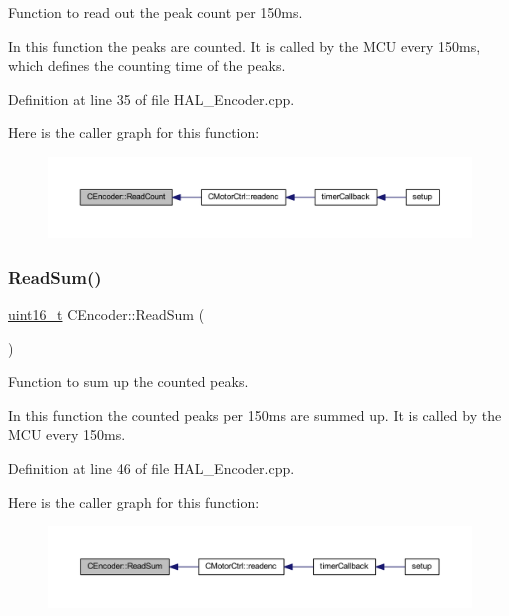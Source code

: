 Function to read out the peak count per 150ms. 

In this function the peaks are counted. It is called by the M\+CU every 150ms, which defines the counting time of the peaks. 

Definition at line 35 of file H\+A\+L\+\_\+\+Encoder.\+cpp.

Here is the caller graph for this function\+:
\nopagebreak
\begin{figure}[H]
\begin{center}
\leavevmode
\includegraphics[width=350pt]{class_c_encoder_a5911a289a7ed8a32e0a89e6191e1651c_icgraph}
\end{center}
\end{figure}
\mbox{\label{class_c_encoder_aa38f17afea1ce9b6efd9d95335a95d26}} 
\subsubsection{\texorpdfstring{Read\+Sum()}{ReadSum()}}
{\footnotesize\ttfamily \mbox{\hyperlink{_a_d_a_s___types_8h_a1f1825b69244eb3ad2c7165ddc99c956}{uint16\+\_\+t}} C\+Encoder\+::\+Read\+Sum (\begin{DoxyParamCaption}{ }\end{DoxyParamCaption})}



Function to sum up the counted peaks. 

In this function the counted peaks per 150ms are summed up. It is called by the M\+CU every 150ms. 

Definition at line 46 of file H\+A\+L\+\_\+\+Encoder.\+cpp.

Here is the caller graph for this function\+:
\nopagebreak
\begin{figure}[H]
\begin{center}
\leavevmode
\includegraphics[width=350pt]{class_c_encoder_aa38f17afea1ce9b6efd9d95335a95d26_icgraph}
\end{center}
\end{figure}
\mbox{\label{class_c_encoder_ab71d6281e3f4d9f875f45368a3434980}} 
